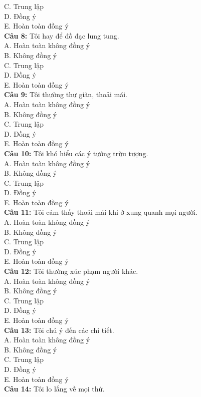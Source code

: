 \begin{multicols}{2}
C. Trung lập \\
D. Đồng ý \\
E. Hoàn toàn đồng ý \\
\textbf{Câu 8:} Tôi hay để đồ đạc lung tung. \\
A. Hoàn toàn không đồng ý \\
B. Không đồng ý \\
C. Trung lập \\
D. Đồng ý \\
E. Hoàn toàn đồng ý \\
\textbf{Câu 9:} Tôi thường thư giãn, thoải mái. \\
A. Hoàn toàn không đồng ý \\
B. Không đồng ý \\
C. Trung lập \\
D. Đồng ý \\
E. Hoàn toàn đồng ý \\
\textbf{Câu 10:} Tôi khó hiểu các ý tưởng trừu tượng. \\
A. Hoàn toàn không đồng ý \\
B. Không đồng ý \\
C. Trung lập \\
D. Đồng ý \\
E. Hoàn toàn đồng ý \\
\textbf{Câu 11:} Tôi cảm thấy thoải mái khi ở xung quanh mọi người. \\
A. Hoàn toàn không đồng ý \\
B. Không đồng ý \\
C. Trung lập \\
D. Đồng ý \\
E. Hoàn toàn đồng ý \\
\textbf{Câu 12:} Tôi thường xúc phạm người khác. \\
A. Hoàn toàn không đồng ý \\
B. Không đồng ý \\
C. Trung lập \\
D. Đồng ý \\
E. Hoàn toàn đồng ý \\
\textbf{Câu 13:} Tôi chú ý đến các chi tiết. \\
A. Hoàn toàn không đồng ý \\
B. Không đồng ý \\
C. Trung lập \\
D. Đồng ý \\
E. Hoàn toàn đồng ý \\
\textbf{Câu 14:} Tôi lo lắng về mọi thứ. \\

\end{multicols}
